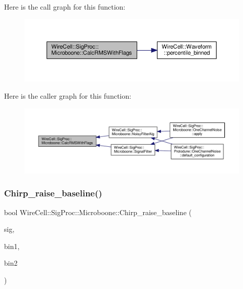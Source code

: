 Here is the call graph for this function\+:
\nopagebreak
\begin{figure}[H]
\begin{center}
\leavevmode
\includegraphics[width=350pt]{namespace_wire_cell_1_1_sig_proc_1_1_microboone_ae364f8dbc0dad92d515850a86baefb13_cgraph}
\end{center}
\end{figure}
Here is the caller graph for this function\+:
\nopagebreak
\begin{figure}[H]
\begin{center}
\leavevmode
\includegraphics[width=350pt]{namespace_wire_cell_1_1_sig_proc_1_1_microboone_ae364f8dbc0dad92d515850a86baefb13_icgraph}
\end{center}
\end{figure}
\mbox{\label{namespace_wire_cell_1_1_sig_proc_1_1_microboone_a16d44a6eccccc47fd7f7967b37f8ba61}} 
\subsubsection{\texorpdfstring{Chirp\+\_\+raise\+\_\+baseline()}{Chirp\_raise\_baseline()}}
{\footnotesize\ttfamily bool Wire\+Cell\+::\+Sig\+Proc\+::\+Microboone\+::\+Chirp\+\_\+raise\+\_\+baseline (\begin{DoxyParamCaption}\item[{\hyperlink{namespace_wire_cell_1_1_waveform_a479175e541c8545e87cd8063b74b6956}{Wire\+Cell\+::\+Waveform\+::realseq\+\_\+t} \&}]{sig,  }\item[{int}]{bin1,  }\item[{int}]{bin2 }\end{DoxyParamCaption})}



